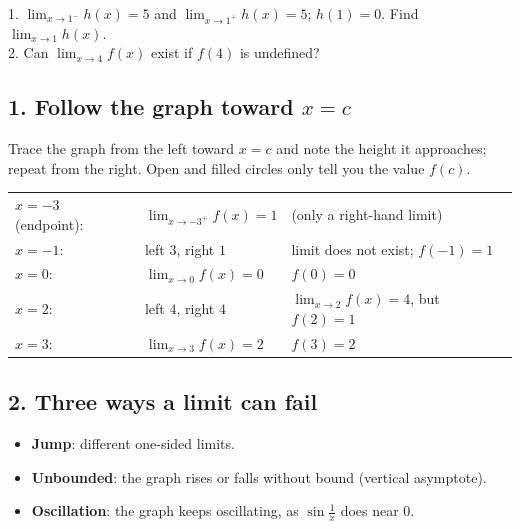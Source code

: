 \begin{quickcheck}
1. $\lim_{x\to1^-}h(x)=5$ and $\lim_{x\to1^+}h(x)=5$; $h(1)=0$. Find $\lim_{x\to1}h(x)$.\\
2. Can $\lim_{x\to4}f(x)$ exist if $f(4)$ is undefined?
\end{quickcheck}


\subsection*{1. Follow the graph toward $x=c$}
Trace the graph from the left toward $x=c$ and note the height it approaches; repeat from the right. Open and filled circles only tell you the value $f(c)$.

\fgraph
\begin{example}
\sol
\begin{tabular}{@{}lll@{}}
$x=-3$ (endpoint): & $\lim_{x\to-3^+}f(x)=1$ & (only a right-hand limit)\\
$x=-1$: & left $3$, right $1$ & limit does not exist; $f(-1)=1$\\
$x=0$: & $\lim_{x\to0}f(x)=0$ & $f(0)=0$\\
$x=2$: & left $4$, right $4$ & $\lim_{x\to2}f(x)=4$, but $f(2)=1$\\
$x=3$: & $\lim_{x\to3}f(x)=2$ & $f(3)=2$
\end{tabular}
\end{example}

\subsection*{2. Three ways a limit can fail}
\begin{itemize}
\item \textbf{Jump}: different one-sided limits.
\item \textbf{Unbounded}: the graph rises or falls without bound (vertical asymptote).
\item \textbf{Oscillation}: the graph keeps oscillating, as $\sin\frac1x$ does near $0$.
\end{itemize}

